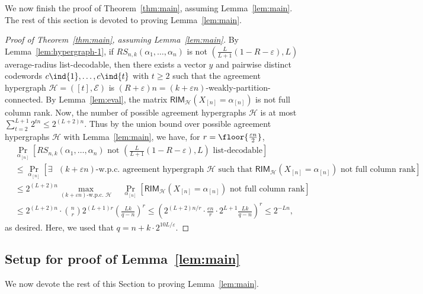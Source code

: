 \documentclass{article}[11pt]
\begin{document}
We now finish the proof of Theorem~\ref{thm:main}, assuming Lemma~\ref{lem:main}. 
The rest of this section is devoted to proving Lemma~\ref{lem:main}.
\begin{proof}[Proof of Theorem~\ref{thm:main}, assuming Lemma~\ref{lem:main}]
  By Lemma~\ref{lem:hypergraph-1}, if $RS_{n,k}(\alpha_1,\dots,\alpha_n)$ is not $\left(\frac{L}{L+1}(1-R-\varepsilon),L\right)$ average-radius list-decodable, then there exists a vector $y$ and pairwise distinct codewords $c\ind{1},\dots,c\ind{t}$ with $t \ge 2$ such that the agreement hypergraph $\mathcal{H} = ([t], \mathcal{E})$ is $(R+\varepsilon)n = (k+\varepsilon n)$-weakly-partition-connected. By Lemma~\ref{lem:eval}, the matrix $\mathsf{RIM}_{\mathcal{H}}(X_{[n]}=\alpha_{[n]})$ is not full column rank. 
  Now, the number of possible agreement hypergraphs $\mathcal{H}$ is at most $\sum_{t=2}^{L+1} 2^{tn} \le 2^{(L+2)n}$.
  Thus by the union bound over possible agreement hypergraphs $\mathcal{H}$ with Lemma~\ref{lem:main}, we have, for $r=\floor{\frac{\varepsilon n}{2}}$,
  \begin{align}
    &\Pr_{\alpha_{[n]}}\left[ RS_{n,k}(\alpha_1,\dots,\alpha_n) \text{ not $\left(\frac{L}{L+1}(1-R-\varepsilon),L\right)$ list-decodable} \right] \nonumber\\
    &\le \Pr_{\alpha_{[n]}}\left[ \exists \text{ $(k+\varepsilon n)$-w.p.c. agreement hypergraph } \mathcal{H} \text{ such that } \mathsf{RIM}_{\mathcal{H}}(X_{[n]}=\alpha_{[n]}) \text{ not full column rank}\right] \nonumber\\
    &\le 2^{(L+2)n} \max_{\text{$(k+\varepsilon n)$-w.p.c. }\mathcal{H}}\quad\Pr_{\alpha_{[n]}}\left[ \mathsf{RIM}_{\mathcal{H}}(X_{[n]}=\alpha_{[n]}) \text{ not full column rank}\right] \nonumber\\
    &\le 2^{(L+2)n} \cdot \binom{n}{r} 2^{(L+1)r} \left( \frac{Lk}{q-n} \right)^r 
    \le \left( 2^{(L+2)n/r}\cdot \frac{e n}{r}\cdot 2^{L+1} \frac{Lk}{q-n} \right)^r 
    \le 2^{-Ln},
    \label{}
  \end{align}
  as desired.
  Here, we used that $q = n + k\cdot 2^{10L/\varepsilon}$.
\end{proof}


\subsection{Setup for proof of Lemma~\ref{lem:main}}
\label{ssec:proof-def}
We now devote the rest of this Section to proving Lemma~\ref{lem:main}.
\end{document}
